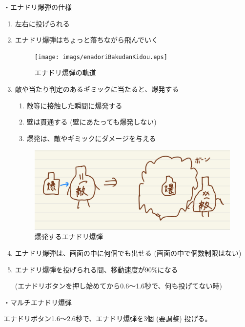 \documentclass[12pt]{jsarticle}
\begin{document}
・エナドリ爆弾の仕様

\begin{enumerate}
  \item 左右に投げられる
  \item エナドリ爆弾はちょっと落ちながら飛んでいく
  \begin{figure}[htbp]
    \begin{center}
      \texttt{[image: imags/enadoriBakudanKidou.eps]}
    \end{center}
    \caption{エナドリ爆弾の軌道}
  \end{figure}

  \item 敵や当たり判定のあるギミックに当たると、爆発する
  \begin{enumerate}
    \item 敵等に接触した瞬間に爆発する
    \item 壁は貫通する (壁にあたっても爆発しない)
    \item 爆発は、敵やギミックにダメージを与える
  \end{enumerate}
  \begin{figure}[htbp]
    \begin{center}
      \includegraphics[width=12cm]{imags/enadoriBakudanBakuhatu.eps}
      \caption{爆発するエナドリ爆弾}
    \end{center}
  \end{figure}

  \item エナドリ爆弾は、画面の中に何個でも出せる (画面の中で個数制限はない)

  \item エナドリ爆弾を投げられる間、移動速度が90\%になる

  (エナドリボタンを押し始めてから0.6〜1.6秒で、何も投げてない時)
\end{enumerate}

\newpage

・マルチエナドリ爆弾

エナドリボタン1.6〜2.6秒で、エナドリ爆弾を3個 (要調整) 投げる。
\end{document}
